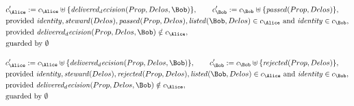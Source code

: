 \begin{align*}
&
c'_
{
\Alice
}
 := 
c_
{
\Alice
}
 \uplus 
\{
\mathit{
delivered_decision
}
(
Prop
,
Delos
,
\Bob
)
\}
, \qquad 
c'_
{
\Bob
}
 := 
c_
{
\Bob
}
 \uplus 
\{
\mathit{
passed
}
(
Prop
,
Delos
)
\}
,\\
&
\text{provided } 
\mathit{
identity
}
,
\mathit{
steward
}
(
Delos
)
,
\mathit{
passed
}
(
Prop
,
Delos
)
,
\mathit{
listed
}
(
\Bob
,
Delos
)
 \in c_
{
\Alice
}
 \text{ and } 
\mathit{
identity
}
 \in c_
{
\Bob
}
,\\
&
\text{provided } 
\mathit{
delivered_decision
}
(
Prop
,
Delos
,
\Bob
)
 \notin c_
{
\Alice
}
,\\
&
\text{guarded by } \emptyset
\end{align*}

\begin{align*}
&
c'_
{
\Alice
}
 := 
c_
{
\Alice
}
 \uplus 
\{
\mathit{
delivered_decision
}
(
Prop
,
Delos
,
\Bob
)
\}
, \qquad 
c'_
{
\Bob
}
 := 
c_
{
\Bob
}
 \uplus 
\{
\mathit{
rejected
}
(
Prop
,
Delos
)
\}
,\\
&
\text{provided } 
\mathit{
identity
}
,
\mathit{
steward
}
(
Delos
)
,
\mathit{
rejected
}
(
Prop
,
Delos
)
,
\mathit{
listed
}
(
\Bob
,
Delos
)
 \in c_
{
\Alice
}
 \text{ and } 
\mathit{
identity
}
 \in c_
{
\Bob
}
,\\
&
\text{provided } 
\mathit{
delivered_decision
}
(
Prop
,
Delos
,
\Bob
)
 \notin c_
{
\Alice
}
,\\
&
\text{guarded by } \emptyset
\end{align*}
